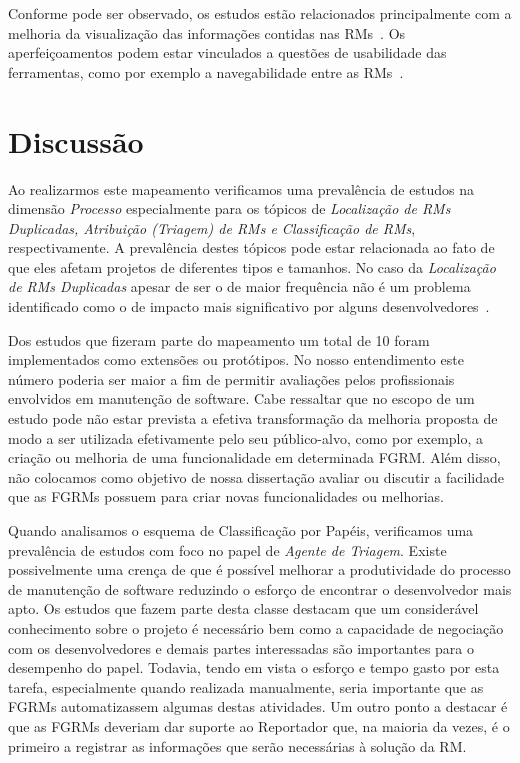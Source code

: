 Conforme pode ser observado, os estudos estão relacionados principalmente com a
melhoria da  visualização das informações contidas nas RMs~\cite{hora2012bug,
	takama2013application, dal2014bug}. Os aperfeiçoamentos podem estar
vinculados a questões de usabilidade das ferramentas, como por exemplo a
navegabilidade entre as RMs~\cite{dal2014bug}.

\section{Discussão}
\label{sec:discussao}

Ao realizarmos este mapeamento verificamos uma prevalência de estudos na
dimensão \textit{Processo} especialmente para os tópicos de \textit{Localização
    de RMs Duplicadas, Atribuição (Triagem) de RMs e Classificação de RMs},
respectivamente. A prevalência destes tópicos pode estar relacionada ao fato de
que eles afetam projetos de diferentes tipos e tamanhos. No caso da
\textit{Localização de RMs Duplicadas} apesar de ser o de maior frequência não é
um problema identificado como o de impacto mais significativo por alguns
desenvolvedores~\cite{bettenburg2008makes}.

Dos estudos que fizeram parte do mapeamento um total de 10 foram implementados
como extensões ou protótipos. No nosso entendimento este número poderia ser
maior a fim de permitir avaliações pelos profissionais envolvidos em manutenção
de software. Cabe ressaltar que no escopo de um estudo pode não estar prevista a
efetiva transformação da melhoria proposta de modo a ser utilizada efetivamente
pelo seu público-alvo, como por exemplo, a criação ou melhoria de uma
funcionalidade em determinada FGRM\@. Além disso, não colocamos como objetivo de
nossa dissertação avaliar ou discutir a facilidade que as FGRMs possuem para
criar novas funcionalidades ou melhorias.


Quando analisamos o esquema de Classificação por Papéis, verificamos uma
prevalência de estudos com foco no papel de \textit{Agente de Triagem}. Existe
possivelmente uma crença de que é possível melhorar a produtividade do processo
de manutenção de software reduzindo o esforço de encontrar o desenvolvedor mais
apto. Os estudos que fazem parte desta classe destacam que um considerável
conhecimento sobre o projeto é necessário bem como a capacidade de negociação
com os desenvolvedores e demais partes interessadas são importantes para o
desempenho do papel. Todavia, tendo em vista o esforço e tempo gasto por esta
tarefa, especialmente quando realizada ma\-nu\-al\-men\-te, seria importante que
as FGRMs automatizassem algumas destas atividades. Um outro ponto a destacar é
que as FGRMs deveriam dar suporte ao Reportador que, na maioria da vezes, é o
primeiro a registrar as informações que serão necessárias à solução da RM\@.

